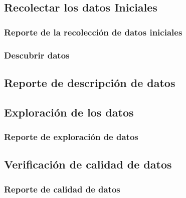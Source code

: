 \subsection{Recolectar los datos Iniciales}
    \subsubsection{Reporte de la recolección de datos iniciales}
\subsubsection{Descubrir datos}
    \subsection{Reporte de descripción de datos}
\subsection{Exploración de los datos}
    \subsubsection{Reporte de exploración de datos}
\subsection{Verificación de calidad de datos}
    \subsubsection{Reporte de calidad de datos}